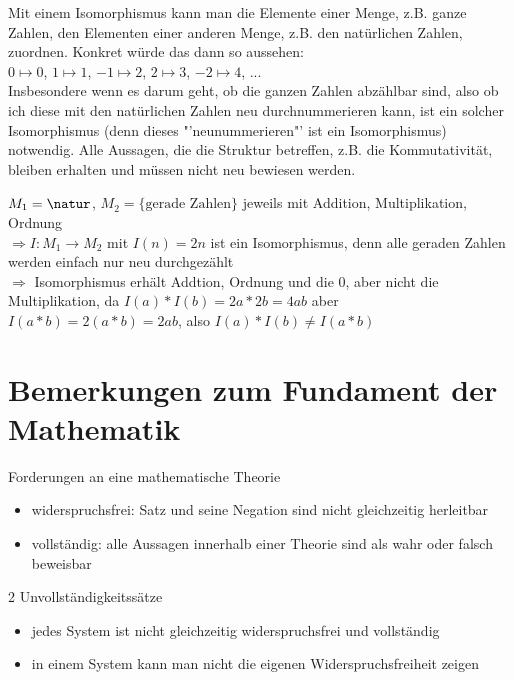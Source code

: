 \begin{*anmerkung}
	Mit einem Isomorphismus kann man die Elemente einer Menge, z.B. ganze Zahlen, den Elementen einer anderen Menge, z.B. den natürlichen Zahlen, zuordnen. Konkret würde das dann so aussehen: \\
	$0\mapsto 0$, $1\mapsto 1$, $-1\mapsto 2$, $2\mapsto 3$, $-2\mapsto 4$, ... \\
	Insbesondere wenn es darum geht, ob die ganzen Zahlen abzählbar sind, also ob ich diese mit den natürlichen Zahlen neu durchnummerieren kann, ist ein solcher Isomorphismus (denn dieses "'neunummerieren"' ist ein Isomorphismus) notwendig. Alle Aussagen, die die Struktur betreffen, z.B. die Kommutativität, bleiben erhalten und müssen nicht neu bewiesen werden.
\end{*anmerkung}

\begin{example}
	$M_1=\natur$, $M_2=\{\text{gerade Zahlen}\}$ jeweils mit Addition, Multiplikation, Ordnung \\
	$\Rightarrow I: M_1\to M_2$ mit $I(n)=2n$ ist ein Isomorphismus, denn alle geraden Zahlen werden 
	einfach nur neu durchgezählt \\
	$\Rightarrow$ Isomorphismus erhält Addtion, Ordnung und die 0, aber nicht die Multiplikation, da
	$I(a)*I(b)=2a*2b=4ab$ aber $I(a*b)=2(a*b)=2ab$, also $I(a)*I(b)\neq I(a*b)$
\end{example}

\section{Bemerkungen zum Fundament der Mathematik}

Forderungen an eine mathematische Theorie
\begin{itemize}
	\item widerspruchsfrei: Satz und seine Negation sind nicht gleichzeitig herleitbar
	\item vollständig: alle Aussagen innerhalb einer Theorie sind als wahr oder falsch beweisbar
\end{itemize}

2 Unvollständigkeitssätze
\begin{itemize}
	\item jedes System ist nicht gleichzeitig widerspruchsfrei und vollständig
	\item in einem System kann man nicht die eigenen Widerspruchsfreiheit zeigen
\end{itemize}